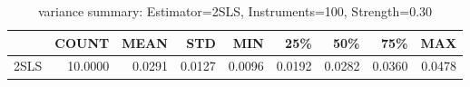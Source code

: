 \begin{table}[ht]
\centering
\caption{variance summary: Estimator=2SLS, Instruments=100, Strength=0.30}
\begin{tabular}{lrrrrrrrr}
\toprule
 & COUNT & MEAN & STD & MIN & 25\% & 50\% & 75\% & MAX \\
\midrule
2SLS & 10.0000 & 0.0291 & 0.0127 & 0.0096 & 0.0192 & 0.0282 & 0.0360 & 0.0478 \\
\bottomrule
\end{tabular}
\end{table}
